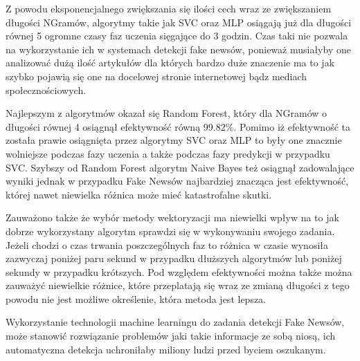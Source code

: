 Z powodu eksponencjalnego zwiększania się ilości cech wraz ze zwiększaniem długości NGramów, 
algorytmy takie jak SVC oraz MLP osiągają już dla długości równej 5 ogromne czasy faz uczenia sięgające 
do 3 godzin. Czas taki nie pozwala na wykorzystanie ich w systemach detekcji fake newsów, ponieważ
musiałyby one analizować dużą ilość artykułów dla których bardzo duże znaczenie ma to jak 
szybko pojawią się one na docelowej stronie internetowej bądz mediach społecznościowych.

Najlepszym z algorytmów okazał się Random Forest, który dla NGramów o długości równej 4
osiągnął efektywność równą 99.82\%. Pomimo iż efektywność ta została prawie osiągnięta przez algorytmy
SVC oraz MLP to były one znacznie wolniejsze podczas fazy uczenia a także podczas fazy 
predykcji w przypadku SVC. Szybszy od Random Forest algorytm Naive Bayes też osiągnął zadowalające wyniki
jednak w przypadku Fake Newsów najbardziej znacząca jest efektywność, której nawet niewielka różnica
może mieć katastrofalne skutki.  

Zauważono także że wybór metody wektoryzacji ma niewielki wpływ na to jak dobrze wykorzystany algorytm 
sprawdzi się w wykonywaniu swojego zadania. Jeżeli chodzi o czas trwania poszczególnych faz to 
różnica w czasie wynosiła zazwyczaj poniżej paru sekund w przypadku dłuższych algorytmów lub poniżej 
sekundy w przypadku krótszych. Pod względem efektywności można także można zauważyć niewielkie różnice,
które przeplatają się
wraz ze zmianą długości z tego powodu nie jest możliwe określenie, która metoda jest lepsza.

Wykorzystanie technologii machine learningu do zadania detekcji Fake Newsów, 
może stanowić rozwiązanie problemów jaki takie informacje ze sobą niosą, ich automatyczna 
detekcja uchroniłaby miliony ludzi przed byciem oszukanym. 

